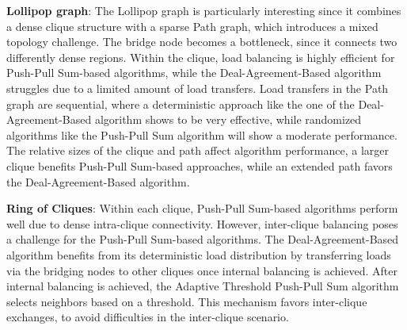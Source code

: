 \textbf{Lollipop graph}: The Lollipop graph is particularly interesting since it combines a dense clique structure with a sparse Path graph, which introduces a mixed topology challenge. The bridge node becomes a bottleneck, since it connects two differently dense regions. Within the clique, load balancing is highly efficient for Push-Pull Sum-based algorithms, while the Deal-Agreement-Based algorithm struggles due to a limited amount of load transfers. Load transfers in the Path graph are sequential, where a deterministic approach like the one of the Deal-Agreement-Based algorithm shows to be very effective, while randomized algorithms like the Push-Pull Sum algorithm will show a moderate performance. The relative sizes of the clique and path affect algorithm performance, a larger clique benefits Push-Pull Sum-based approaches, while an extended path favors the Deal-Agreement-Based algorithm.

\textbf{Ring of Cliques}: Within each clique, Push-Pull Sum-based algorithms perform well due to dense intra-clique connectivity. However, inter-clique balancing poses a challenge for the Push-Pull Sum-based algorithms. The Deal-Agreement-Based algorithm benefits from its deterministic load distribution by transferring loads via the bridging nodes to other cliques once internal balancing is achieved. After internal balancing is achieved, the Adaptive Threshold Push-Pull Sum algorithm selects neighbors based on a threshold. This mechanism favors inter-clique exchanges, to avoid difficulties in the inter-clique scenario. 